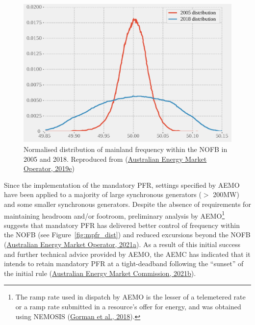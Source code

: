 \documentclass[12pt,a4paper,]{report}
\begin{document}
\begin{figure}
\hypertarget{fig:nofb_freq_2005_2018}{%
\centering
\includegraphics{source/figures/nem_nofb_frequency_2005_2018_digitised.eps}
\caption[NEM mainland frequency distributions, 2005 and 2018]{Normalised
distribution of mainland frequency within the NOFB in 2005 and 2018.
Reproduced from
(\protect\hyperlink{ref-australianenergymarketoperatorElectricityRuleChange2019a}{Australian
Energy Market Operator, 2019e})}\label{fig:nofb_freq_2005_2018}
}
\end{figure}

Since the implementation of the mandatory PFR, settings specified by
AEMO have been applied to a majority of large synchronous generators
(\(>\) 200MW) and some smaller synchronous generators. Despite the
absence of requirements for maintaining headroom and/or footroom,
preliminary analysis by AEMO\footnote{The ramp rate used in dispatch by
  AEMO is the lesser of a telemetered rate or a ramp rate submitted in a
  resource's offer for energy, and was obtained using NEMOSIS
  (\protect\hyperlink{ref-gormanNEMOSISNEMOpen2018}{Gorman et al.,
  2018}).} suggests that mandatory PFR has delivered better control of
frequency within the NOFB (see Figure~\ref{fig:mpfr_dist}) and reduced
excursions beyond the NOFB
(\protect\hyperlink{ref-australianenergymarketoperatorEnduringPrimaryFrequency2021}{Australian
Energy Market Operator, 2021a}). As a result of this initial success and
further technical advice provided by AEMO, the AEMC has indicated that
it intends to retain mandatory PFR at a tight-deadband following the
``sunset'' of the initial rule
(\protect\hyperlink{ref-australianenergymarketcommissionPrimaryFrequencyResponse2021}{Australian
Energy Market Commission, 2021b}).
\end{document}
